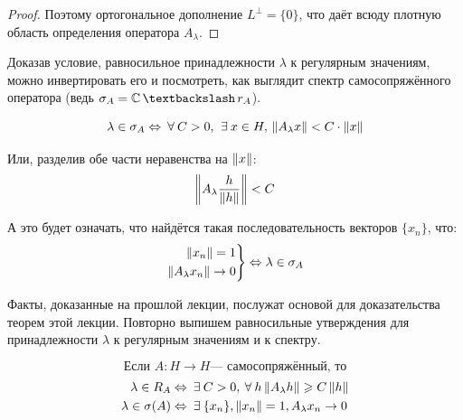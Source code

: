 \documentclass[12pt]{article}
\begin{document}
\begin{proof}
			Поэтому ортогональное дополнение $L^{\perp} = \{0\}$, что даёт всюду плотную область определения оператора $A_{\lambda}$.
		\end{proof}
	
		Доказав условие, равносильное принадлежности $\lambda$ к регулярным значениям, можно инвертировать его и посмотреть,
		как выглядит спектр самосопряжённого оператора%
		(ведь $\sigma_A = \mathbb{C} \,\textbackslash\, r_A$).
	
		$$\lambda \in \sigma_A \Leftrightarrow \forall C > 0,\, \exists x \in H,\, \norm{A_{\lambda}x} < C\cdot\norm{x}$$
	
		Или, разделив обе части неравенства на $\left\| x \right\|$:
		$$\left\| A_{\lambda} \dfrac{h}{\left\| h \right\|} \right\| < C$$
	
		А это будет означать, что найдётся такая последовательность векторов $\{x_n\}$, что:
		$$
			\left.
			\begin{aligned}
				\left\| x_n \right\| = 1 \\
				\left\| A_{\lambda}x_n \right\| \rightarrow 0
			\end{aligned}
			\right\}
			\Leftrightarrow
			\lambda \in \sigma_A
		$$


		Факты, доказанные на прошлой лекции, послужат основой для доказательства теорем этой лекции.
		Повторно выпишем равносильные утверждения для принадлежности $\lambda$ к регулярным значениям и к спектру.
	
		$$\text{Если } A:H \rightarrow H \text{--- самосопряжённый, то}$$
		\begin{align}
			\lambda \in R_A       &\equals \exists C > 0, \forall h \norm{A_{\lambda}h} \geq C\norm{h} \label{eq:regCrit}\\
			\lambda \in \sigma(A) &\equals \exists\{x_n\}, \norm{x_n} = 1, A_{\lambda}x_n \rightarrow 0 \label{eq:specCrit}
		\end{align}
	
\end{document}

